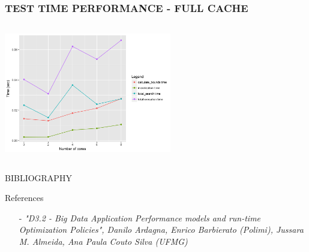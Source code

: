 \documentclass[10pt, compress]{beamer}
\begin{document}
\begin{frame}[fragile]
	\frametitle{TEST TIME PERFORMANCE - FULL CACHE}
	\centering
	
	\includegraphics[width=7.3cm,height=6cm]{images_ready/test1_150_10_0_yes_s.png}
			
	
	
\end{frame}










\begin{frame}{BIBLIOGRAPHY}

  
  \vfill
  References
  \begin{itemize}
  	\item[-] \emph{"D3.2 - Big Data Application Performance models and run-time Optimization Policies", Danilo Ardagna, Enrico Barbierato (Polimi), Jussara M. Almeida, Ana Paula Couto Silva (UFMG)}
  \end{itemize}
  
\end{frame}
\end{document}

